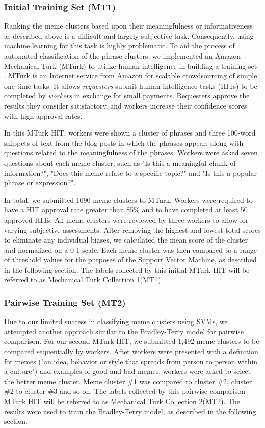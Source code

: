 \documentclass{sig-alternate}
\begin{document}
\subsubsection{Initial Training Set (MT1)}
Ranking the meme clusters based upon their meaningfulness or informativeness as described above is a difficult and largely subjective task. Consequently, using machine learning for this task is highly problematic. To aid the process of automated classification of the phrase clusters, we implemented an Amazon Mechanical Turk (MTurk) to utilize human intelligence in building a training set \cite{Barr2006}. MTurk is an Internet service from Amazon for scalable crowdsourcing of simple one-time tasks. It allows \emph{requesters} submit human intelligence tasks (HITs) to be completed by \emph{workers} in exchange for small payments. Requesters approve the results they consider satisfactory, and workers increase their confidence scores with high approval rates.

In this MTurk HIT, workers were shown a cluster of phrases and three 100-word snippets of text from the blog posts in which the phrases appear, along with questions related to the meaningfulness of the phrases. Workers were asked seven questions about each meme cluster, such as "Is this a meaningful chunk of information?", "Does this meme relate to a specific topic?" and "Is this a popular phrase or expression?".

In total, we submitted 1090 meme clusters to MTurk. Workers were required to have a HIT approval rate greater than 85\% and to have completed at least 50 approved HITs. All meme clusters were reviewed by three workers to allow for varying subjective assessments. After removing the highest and lowest total scores to eliminate any individual biases, we calculated the mean score of the cluster and normalized on a 0-1 scale. Each meme cluster was then compared to a range of threshold values for the purposes of the Support Vector Machine, as described in the following section. The labels collected by this initial MTurk HIT will be referred to as Mechanical Turk Collection 1(MT1).

\subsubsection{Pairwise Training Set (MT2)}
Due to our limited success in classifying meme clusters using SVMs, we attempted another approach similar to the Bradley-Terry model \cite{Bradley1952} for pairwise comparison. For our second MTurk HIT, we submitted 1,492 meme clusters to be compared sequentially by workers. After workers were presented with a definition for memes ("an idea, behavior or style that spreads from person to person within a culture") and examples of good and bad memes, workers were asked to select the better meme cluster. Meme cluster \#1 was compared to cluster \#2, cluster \#2 to cluster \#3 and so on. The labels collected by this pairwise comparison MTurk HIT will be referred to as Mechanical Turk Collection 2(MT2). The results were used to train the Bradley-Terry model, as described in the following section.
\end{document}

